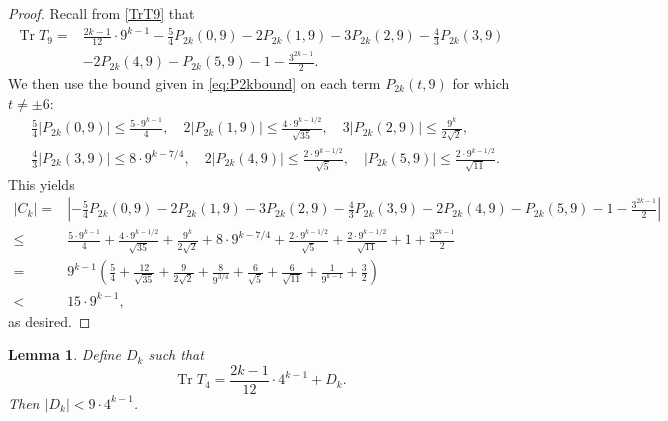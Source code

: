 \documentclass[11pt,letterpaper,reqno]{amsart}
\numberwithin{figure}{section}
\numberwithin{table}{section}
\theoremstyle{definition}
\theoremstyle{plain}
\newtheorem{lemma}[theorem]{Lemma}
\theoremstyle{definition}
\theoremstyle{definition}
\theoremstyle{remark}
\numberwithin{equation}{section}
\DeclareMathOperator{\Tr}{Tr}
\begin{document}
\begin{proof}
    Recall from \eqref{TrT9} that
    \begin{align}
        \Tr T_9=&\frac{2k-1}{12}\cdot 9^{k-1}-\frac{5}{4}P_{2k}(0,9)-2P_{2k}(1,9)-3P_{2k}(2,9)-\frac{4}{3}P_{2k}(3,9)\\
    &-2P_{2k}(4,9)-P_{2k}(5,9)-1-\frac{3^{2k-1}}{2}.
    \end{align}
    We then use the bound given in \eqref{eq:P2kbound} on each term $P_{2k}(t, 9)$ for which $t \neq \pm 6$:
    \begin{align}
        &\frac{5}{4}|P_{2k}(0,9)|\leq\frac{5\cdot9^{k-1}} {4}, \quad 2|P_{2k}(1,9)|\leq \frac{4\cdot9^{k-1/2}}{\sqrt{35}}, \quad
        3|P_{2k}(2,9)|\leq \frac{9^{k}}{2\sqrt{2}},\\
        &\frac{4}{3}|P_{2k}(3,9)|\leq 8\cdot9^{k-7/4}, \quad
        2|P_{2k}(4,9)|\leq \frac{2\cdot9^{k-1/2}} {\sqrt{5}}, \quad |P_{2k}(5,9)|\leq \frac{2\cdot9^{k-1/2}}{\sqrt{11}}.
    \end{align}
    This yields
    \begin{align}
        |C_k|=&\left|-\frac{5}{4}P_{2k}(0,9)-2P_{2k}(1,9)-3P_{2k}(2,9)-\frac{4}{3}P_{2k}(3,9)-2P_{2k}(4,9)-P_{2k}(5,9)-1-\frac{3^{2k-1}}{2}\right|\\
        \leq&\frac{5\cdot9^{k-1}}{4}+\frac{4\cdot9^{k-1/2}}{\sqrt{35}}+\frac{9^{k}}{2\sqrt{2}}+ 8\cdot9^{k-7/4}+\frac{2\cdot9^{k-1/2}}{\sqrt{5}}+\frac{2\cdot9^{k-1/2}}{\sqrt{11}}+1+\frac{3^{2k-1}}{2}\\
        =&9^{k-1}\left(\frac{5}{4}+\frac{12}{\sqrt{35}}+\frac{9}{2\sqrt{2}}+\frac{8}{9^{3/4}}+\frac{6}{\sqrt{5}}+\frac{6}{\sqrt{11}}+\frac{1}{9^{k-1}}+\frac{3}{2}\right)\\
        <&15\cdot 9^{k-1},
    \end{align}
    as desired.
\end{proof}
\begin{lemma}\label{lemma:TrT4}
    Define $D_k$ such that
    \begin{equation}
        \Tr T_4 = \frac{2k-1}{12}\cdot 4^{k-1} +D_k.
    \end{equation}
    Then $|D_k|< 9\cdot 4^{k-1}$.
\end{lemma}
\end{document}
